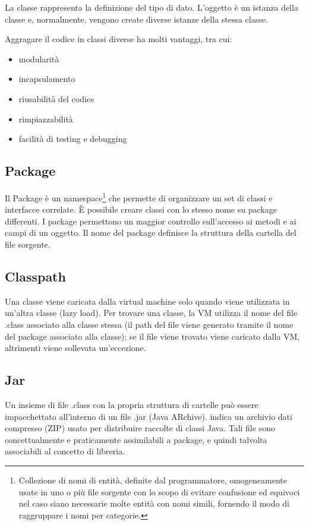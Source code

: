 \documentclass[a4paper,12pt,twoside]{book}
\begin{document}
La classe rappresenta la definizione del tipo di dato. L'oggetto è un
istanza della classe e, normalmente, vengono create diverse istanze
della stessa classe.

Aggragare il codice in classi diverse ha molti vantaggi, tra cui:

\begin{itemize}
\item modularità
\item incapsulamento
\item riusabilità del codice
\item rimpiazzabilità
\item facilità di testing e debugging
\end{itemize}

\subsection{Package}

Il Package è un namespace\footnote{Collezione di nomi di entità,
  definite dal programmatore, omogeneamente usate in uno o più file
  sorgente con lo scopo di evitare confusione ed equivoci nel caso
  siano necessarie molte entità con nomi simili, fornendo il modo di
  raggruppare i nomi per categorie.} che permette di organizzare un
set di classi e interfacce correlate. È possibile creare classi con lo
stesso nome su package differenti. I package permettono un maggior
controllo sull'accesso ai metodi e ai campi di un oggetto. Il nome del
package definisce la struttura della cartella del file sorgente.

\subsection{Classpath}

Una classe viene caricata dalla virtual machine solo quando viene
utilizzata in un'altra classe (lazy load). Per trovare una classe, la
VM utilizza il nome del file .class associato alla classe stessa (il
path del file viene generato tramite il nome del package associato
alla classe); se il file viene trovato viene caricato dalla VM,
altrimenti viene sollevata un'eccezione.

\subsection{Jar}

Un insieme di file .class con la propria struttura di cartelle può
essere impacchettato all'interno di un file .jar (Java
ARchive). indica un archivio dati compresso (ZIP) usato per
distribuire raccolte di classi Java. Tali file sono concettualmente e
praticamente assimilabili a package, e quindi talvolta associabili al
concetto di libreria.
\end{document}
